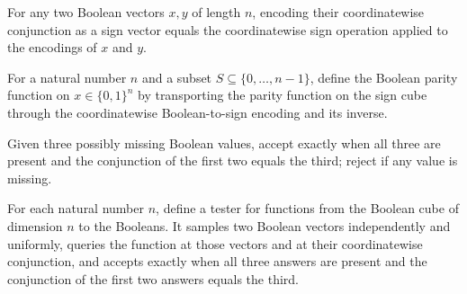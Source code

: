 \begin{theorem}
\label{FABL.pcppBoolCubeSignEquiv_boolCubeAnd}
\leanok
{}
For any two Boolean vectors $x,y$ of length $n$, encoding their coordinatewise
conjunction as a sign vector equals the coordinatewise sign operation applied to the
encodings of $x$ and $y$.
\end{theorem}

\begin{definition}
\label{FABL.boolParityFunction}
\leanok
{}
For a natural number $n$ and a subset $S\subseteq\{0,\ldots,n-1\}$, define the Boolean
parity function on $x\in\{0,1\}^n$ by transporting the parity function on the sign cube
through the coordinatewise Boolean-to-sign encoding and its inverse.
\end{definition}

\begin{definition}
\label{FABL.boolAndTranscriptAccept}
\leanok
Given three possibly missing Boolean values, accept exactly when all three are present
and the conjunction of the first two equals the third; reject if any value is missing.
\end{definition}

\begin{definition}
\label{FABL.boolAndFunctionTester}
\leanok
{}
For each natural number $n$, define a tester for functions from the Boolean cube of
dimension $n$ to the Booleans. It samples two Boolean vectors independently and
uniformly, queries the function at those vectors and at their coordinatewise
conjunction, and accepts exactly when all three answers are present and the conjunction
of the first two answers equals the third.
\end{definition}

